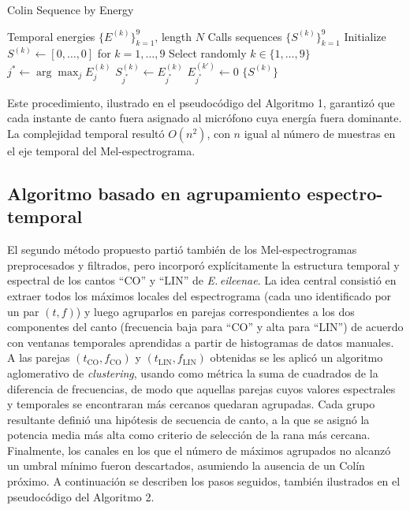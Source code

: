 \begin{algorithm}
    \caption{Colin Sequence by Energy}
    \begin{algorithmic}[1]
    \Require 
      Temporal energies \(\{E^{(k)}\}_{k=1}^9\), length \(N\)
    \Ensure
      Calls sequences \(\{S^{(k)}\}_{k=1}^9\)
    \State Initialize \(S^{(k)} \leftarrow [0,\dots,0]\) for \(k=1,\dots,9\)
      \State Select randomly \(k\in\{1,\dots,9\}\)
      \State \(j^* \leftarrow \arg\max_j E^{(k)}_j\)
      \State \(S^{(k)}_{j^*} \leftarrow E^{(k)}_{j^*}\)
        \State \(E^{(k')}_{j^*} \leftarrow 0\)
      \EndFor
    \EndWhile
    \State \Return \(\{S^{(k)}\}\)
    \end{algorithmic}
\end{algorithm}

Este procedimiento, ilustrado en el pseudocódigo del 
Algoritmo 1, garantizó que cada instante de canto fuera 
asignado al micrófono cuya energía fuera dominante. 
La complejidad temporal resultó \(O(n^2)\), con \(n\) igual al 
número de muestras en el eje temporal del Mel-espectrograma.



\subsection{Algoritmo basado en agrupamiento espectro-temporal}
\label{sec:alg_aglomerativo}

El segundo método propuesto partió también de los 
Mel-espectrogramas preprocesados y filtrados, pero incorporó 
explícitamente la estructura temporal y espectral de los cantos 
“CO” y “LIN” de \emph{E.\,eileenae}. La idea central consistió 
en extraer todos los máximos locales del espectrograma (cada 
uno identificado por un par \((t,f)\)) y luego agruparlos en 
parejas correspondientes a los dos componentes del canto 
(frecuencia baja para “CO” y alta para “LIN”) de acuerdo con 
ventanas temporales aprendidas a partir de histogramas de datos 
manuales. A las parejas \((t_{\mathrm{CO}},f_{\mathrm{CO}})\) y 
\((t_{\mathrm{LIN}},f_{\mathrm{LIN}})\) obtenidas se les aplicó 
un algoritmo aglomerativo de \textit{clustering}, usando como métrica la 
suma de cuadrados de la diferencia de frecuencias, de modo que 
aquellas parejas cuyos valores espectrales y temporales se 
encontraran más cercanos quedaran agrupadas. Cada grupo 
resultante definió una hipótesis de secuencia de canto, a la que 
se asignó la potencia media más alta como criterio de selección 
de la rana más cercana. Finalmente, los canales en los que el 
número de máximos agrupados no alcanzó un umbral mínimo fueron 
descartados, asumiendo la ausencia de un Colín próximo.
A continuación se describen los pasos seguidos, también 
ilustrados en el pseudocódigo del Algoritmo 2.

